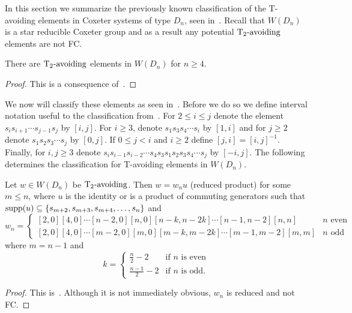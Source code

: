 In this section we summarize the previously known classification of the T-avoiding elements in Coxeter systems of type $D_n$, seen in~\cite{Gern2013a}. Recall that $W(D_n)$ is a star reducible Coxeter group and as a result any potential $\operatorname{T_2-\mathrm{avoiding}}$ elements are not FC.

\begin{proposition}
 There are $\operatorname{T_2-\mathrm{avoiding}}$ elements in $W(D_n)$ for $n \geq 4$.
\begin{proof}
	This is a consequence of~\cite[Section 2.2]{Gern2013a}. 
\end{proof}
\end{proposition}

We now will classify these elements as seen in~\cite{Gern2013a}. Before we do so we define interval notation useful to the classification from~\cite[Definition 2.3.1]{Gern2013a}. For $2 \leq i \leq j$ denote the element $s_{i}s_{i+1} \cdots s_{j-1}s_j$ by $[i,j]$. For $i \geq 3$, denote $s_1s_3s_4\cdots s_i$ by $[1,i]$ and for $j \geq 2$ denote $s_1s_2s_3 \cdots s_j$ by $[0,j]$. If $0 \leq j <i$ and $i \geq 2$ define $[j,i]=[i,j]^{-1}$. Finally, for $i,j \geq 3$ denote $s_is_{i-1}s_{i-2} \cdots s_4s_3s_1s_2s_3s_4 \cdots s_j$ by $[-i,j]$. The following determines the classification for T-avoiding elements in $W(D_n)$. 

\begin{proposition}
	Let $w \in W(D_n)$ be $\operatorname{T_2-\mathrm{avoiding}}$. 
Then $w=w_nu$ (reduced product) for some $m \leq n$, where $u$ is the identity or is a product of commuting generators  such that $\mathrm{supp}(u) \subseteq\{s_{m+2}, s_{m+3}, s_{m+4}, \ldots, s_n\}$ and 
\[ w_n=
\begin{cases}
	[2,0][4,0] \cdots [n-2,0][n,0][n-k,n-2k] \cdots [n-1,n-2][n,n]  &  \text{$n$ even}\\
	[2,0][4,0] \cdots [m-2,0][m,0][m-k,m-2k] \cdots [m-1,m-2][m,m] &  \text{$n$ odd}
\end{cases}
\] where $m=n-1$ and 
\[
k= 
\begin{cases}
\frac{n}{2}-2 & \text{if $n$ is even}\\
\frac{n-1}{2}-2 & \text{if $n$ is odd.}
\end{cases}
\]
\begin{proof}
	This is~\cite[Lemmas 2.2.18 and 2.3.4]{Gern2013a}. Although it is not immediately obvious, $w_n$ is reduced and not FC.
\end{proof}
\end{proposition}

